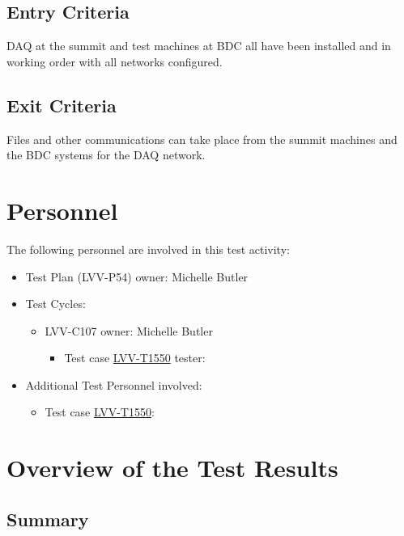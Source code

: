 \documentclass[DM,lsstdraft,STR,toc]{lsstdoc}
\begin{document}
  \subsection{Entry Criteria}
  DAQ at the summit and test machines at BDC all have been installed and
in working order with all networks configured.~~


  \subsection{Exit Criteria}
  Files and other communications can take place from the summit machines
and the BDC systems for the DAQ network.~~



\newpage
\section{Personnel}
\label{sect:personnel}

The following personnel are involved in this test activity:

\begin{itemize}
\item Test Plan (LVV-P54) owner: Michelle Butler
\item Test Cycles:
\begin{itemize}
  \item LVV-C107 owner: 
    Michelle Butler
  \begin{itemize}
    \item Test case \href{https://jira.lsstcorp.org/secure/Tests.jspa#/testCase/LVV-T1550}{LVV-T1550} tester: 
  \end{itemize}
\end{itemize}
\item Additional Test Personnel involved:
  \begin{itemize}
    \item Test case \href{https://jira.lsstcorp.org/secure/Tests.jspa#/testCase/LVV-T1550}{LVV-T1550}: 
  \end{itemize}
\end{itemize}

\newpage

\section{Overview of the Test Results}
\label{sect:overview}

\subsection{Summary}
\label{sect:summarytable}
\end{document}
